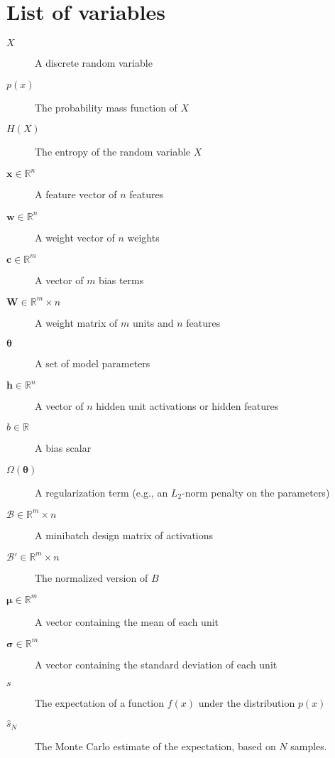 \chapter*{List of variables}

\begin{description}
    \item[$X$] A discrete random variable
    \item[$p(x)$] The probability mass function of $X$
    \item[$H(X)$] The entropy of the random variable $X$
    \item[$\mathbf{x} \in \mathbb{R}^n$] A feature vector of $n$ features
    \item[$\mathbf{w} \in \mathbb{R}^n$] A weight vector of $n$ weights
    \item[$\mathbf{c} \in \mathbb{R}^m$] A vector of $m$ bias terms
    \item[$\mathbf{W} \in \mathbb{R}^m\times n$] A weight matrix of $m$ units and $n$ features
    \item[$\boldsymbol{\theta}$] A set of model parameters
    \item[$\mathbf{h} \in \mathbb{R}^n$] A vector of $n$ hidden unit activations or hidden features
    \item[$b \in \mathbb{R}$] A bias scalar 
    \item[$\Omega(\boldsymbol{\theta})$] A regularization term (e.g., an $L_2$-norm penalty on the parameters)
    \item[$\mathcal{B} \in \mathbb{R}^m\times n$] A minibatch design matrix of activations
    \item[$\mathcal{B}' \in \mathbb{R}^m\times n$] The normalized version of $B$
    \item[$\boldsymbol{\mu} \in \mathbb{R}^m$] A vector containing the mean of each unit
    \item[$\boldsymbol{\sigma} \in \mathbb{R}^m$] A vector containing the standard deviation of each unit
    
    \item[$s$] The expectation of a function $f(x)$ under the distribution $p(x)$
    \item[$\hat{s}_N$] The Monte Carlo estimate of the expectation, based on $N$ samples.
  \end{description}
